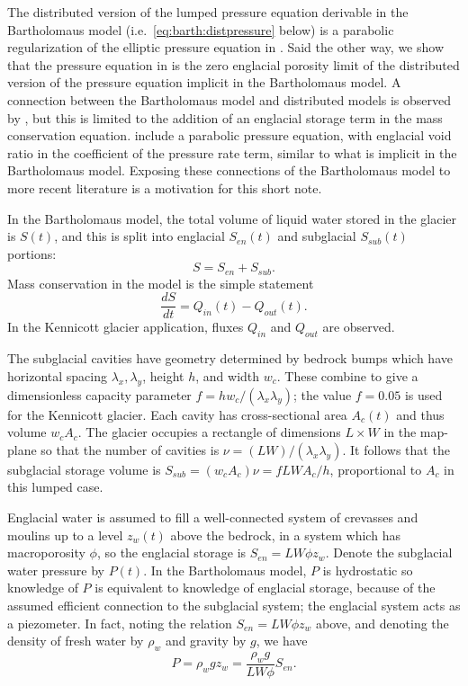 \documentclass[twocolumn,letterpaper]{igs}
\begin{document}
The distributed version of the lumped pressure equation derivable in the Bartholomaus model (i.e.~\eqref{eq:barth:distpressure} below) is a parabolic regularization of the elliptic pressure equation in \cite{Schoofetal2012}.  Said the other way, we show that the pressure equation in \cite{Schoofetal2012} is the zero englacial porosity limit of the distributed version of the pressure equation implicit in the Bartholomaus model.  A connection between the Bartholomaus model and distributed models is observed by \cite{Hewitt2013}, but this is limited to the addition of an englacial storage term in the mass conservation equation.  \cite{Werderetal2013} include a parabolic pressure equation, with englacial void ratio in the coefficient of the pressure rate term, similar to what is implicit in the Bartholomaus model.  Exposing these connections of the Bartholomaus model to more recent literature is a motivation for this short note.

In the Bartholomaus model, the total volume of liquid water stored in the glacier is $S(t)$, and this is split into englacial $S_{en}(t)$ and subglacial $S_{sub}(t)$ portions:
\begin{equation}
S = S_{en} + S_{sub}.  \label{eq:barth:kinematics}
\end{equation}
Mass conservation in the model is the simple statement \citep{Bartholomausetal2008}
\begin{equation}
\frac{dS}{dt} = Q_{in}(t) - Q_{out}(t). \label{eq:barth:massconserve}
\end{equation}
In the Kennicott glacier application, fluxes $Q_{in}$ and $Q_{out}$ are observed.

The subglacial cavities have geometry determined by bedrock bumps which have horizontal spacing $\lambda_x,\lambda_y$, height $h$, and width $w_c$.  These combine to give a dimensionless capacity parameter $f=h w_c/(\lambda_x \lambda_y)$; the value $f=0.05$ is used for the Kennicott glacier.  Each cavity has cross-sectional area $A_c(t)$ and thus volume $w_c A_c$.  The glacier occupies a rectangle of dimensions $L\times W$ in the map-plane so that the number of cavities is $\nu = (LW)/(\lambda_x\lambda_y)$.  It follows that the subglacial storage volume is $S_{sub} = (w_c A_c) \nu = f L W A_c / h$, proportional to $A_c$ in this lumped case.

Englacial water is assumed to fill a well-connected system of crevasses and moulins up to a level $z_w(t)$ above the bedrock, in a system which has macroporosity $\phi$, so the englacial storage is $S_{en}=L W \phi z_w$.  Denote the subglacial water pressure by $P(t)$.  In the Bartholomaus model, $P$ is hydrostatic so knowledge of $P$ is equivalent to knowledge of englacial storage, because of the assumed efficient connection to the subglacial system; the englacial system acts as a piezometer.  In fact, noting the relation $S_{en}=L W \phi z_w$ above, and denoting the density of fresh water by $\rho_w$ and gravity by $g$, we have
\begin{equation}
P = \rho_w g z_w = \frac{\rho_w g}{LW\phi} S_{en}.  \label{eq:barth:englacialpressure}
\end{equation}
\end{document}
